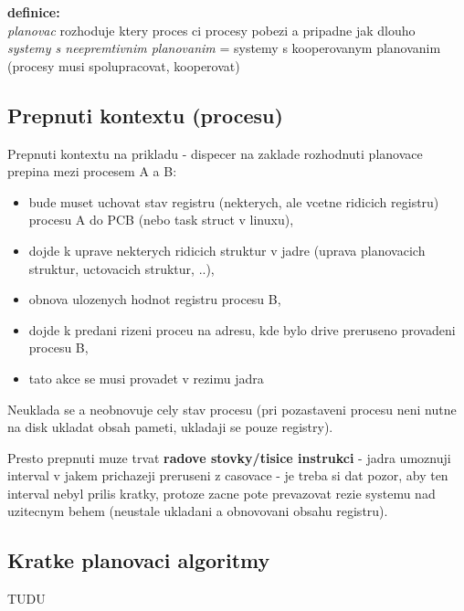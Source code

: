 \documentclass[a4paper, 11pt]{article}
\begin{document}
\textbf{definice:} \\[0.5em]
\textit{planovac} rozhoduje ktery proces ci procesy pobezi a pripadne jak dlouho \\[0.2em]
\textit{systemy s neepremtivnim planovanim} = systemy s kooperovanym planovanim (procesy musi spolupracovat, kooperovat) \\

\subsection{Prepnuti kontextu (procesu)}
Prepnuti kontextu na prikladu - dispecer na zaklade rozhodnuti planovace prepina mezi procesem A a B:
\begin{itemize}
    \item bude muset uchovat stav registru (nekterych, ale vcetne ridicich registru) procesu A do PCB (nebo task struct v linuxu),
    \item dojde k uprave nekterych ridicich struktur v jadre (uprava planovacich struktur, uctovacich struktur, ..),
    \item obnova ulozenych hodnot registru procesu B,
    \item dojde k predani rizeni proceu na adresu, kde bylo drive preruseno provadeni procesu B,
    \item tato akce se musi provadet v rezimu jadra \\
\end{itemize}

Neuklada se a neobnovuje cely stav procesu (pri pozastaveni procesu neni nutne na disk ukladat obsah pameti, ukladaji se pouze registry).

Presto prepnuti muze trvat \textbf{radove stovky/tisice instrukci} - jadra umoznuji interval v jakem prichazeji preruseni z casovace - je treba si dat pozor, aby ten interval nebyl prilis kratky, protoze zacne pote prevazovat rezie systemu nad uzitecnym behem (neustale ukladani a obnovovani obsahu registru).

\newpage

\subsection{Kratke planovaci algoritmy}
TUDU
\end{document}
